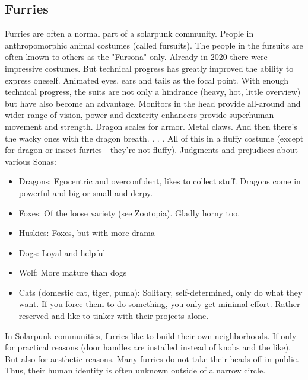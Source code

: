 \subsection{Furries}
Furries are often a normal part of a solarpunk community. People in anthropomorphic animal costumes (called fursuits). The people in the fursuits are often known to others as the "Fursona" only.
Already in 2020 there were impressive costumes. But technical progress has greatly improved the ability to express oneself. Animated eyes, ears and tails as the focal point.
With enough technical progress, the suits are not only a hindrance (heavy, hot, little overview) but have also become an advantage. Monitors in the head provide all-around and wider range of vision, power and dexterity enhancers provide superhuman movement and strength. Dragon scales for armor. Metal claws. And then there's the wacky ones with the dragon breath. . . .
All of this in a fluffy costume (except for dragon or insect furries - they're not fluffy).
Judgments and prejudices about various Sonas: 

\begin{itemize}
    \item Dragons: Egocentric and overconfident, likes to collect stuff. Dragons come in powerful and big or small and derpy.
    \item Foxes: Of the loose variety (see Zootopia). Gladly horny too.
    \item Huskies: Foxes, but with more drama
    \item Dogs: Loyal and helpful
    \item Wolf: More mature than dogs
    \item Cats (domestic cat, tiger, puma): Solitary, self-determined, only do what they want. If you force them to do something, you only get minimal effort. Rather reserved and like to tinker with their projects alone.
\end{itemize}

In Solarpunk communities, furries like to build their own neighborhoods. If only for practical reasons (door handles are installed instead of knobs and the like). But also for aesthetic reasons.
Many furries do not take their heads off in public. Thus, their human identity is often unknown outside of a narrow circle.